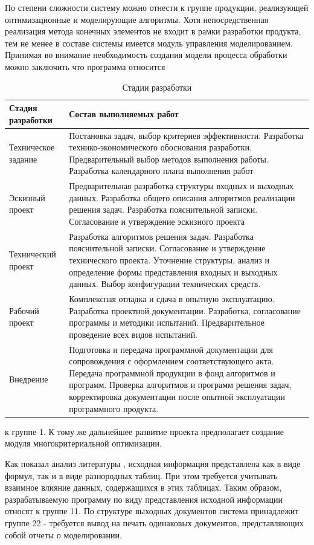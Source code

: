 \documentclass[14pt,oneside,final]{extreport}
\begin{document}
	По степени сложности систему можно отнести к группе продукции, реализующей оптимизационные и моделирующие алгоритмы. Хотя непосредственная реализация метода конечных элементов не входит в рамки разработки продукта, тем не менее в составе системы имеется модуль управления моделированием. Принимая во внимание необходимость создания модели процесса обработки можно заключить что программа относится 	\newpage
		\begin{table}[h!]
			\centering
			\caption{Стадии разработки}\label{tab:economy} 
			\begin{tabularx}{\textwidth}{|l|X|}
				
				\hline Стадия разработки & \multicolumn{1}{Z|}{Состав выполняемых работ }\\ 
				\hline Техническое задание & Постановка задач, выбор критериев эффективности. Разработка технико-экономического обоснования разработки. Предварительный выбор методов выполнения работы. Разработка календарного плана выполнения работ   \\ 
				\hline Эскизный проект & Предварительная разработка структуры входных и выходных данных. Разработка общего описания алгоритмов реализации решения задач. Разработка пояснительной записки. Согласование и утверждение эскизного проекта \\ 
				\hline Технический проект & Разработка алгоритмов решения задач. Разработка пояснительной записки. Согласование и утверждение технического проекта. Уточнение структуры, анализ и определение формы представления входных и выходных данных. Выбор конфигурации технических средств.  \\ 			
				\hline Рабочий проект & Комплексная отладка и сдача в опытную эксплуатацию. Разработка проектной документации. Разработка, согласование программы и методики испытаний. Предварительное проведение всех видов  испытаний.   \\ 			
				\hline Внедрение & Подготовка и передача программной документации для сопровождения с оформлением соответствующего акта. Передача программной продукции в фонд алгоритмов и программ. Проверка алгоритмов и программ решения задач, корректировка документации после опытной эксплуатации программного продукта. \\ 
				\hline 
			\end{tabularx}
		\end{table}
	\noindent к группе 1. К тому же дальнейшее развитие проекта предполагает создание модуля многокритериальной оптимизации. 
	
	Как показал анализ литературы \cite{book:Kosilova}, исходная информация представлена как в виде формул, так и в виде разнородных таблиц. При этом требуется учитывать взаимное влияние данных, содержащихся в этих таблицах. Таким образом, разрабатываемую программу по виду представления исходной информации относят к группе 11. По структуре выходных документов система принадлежит группе 22 - требуется вывод на печать одинаковых документов, представляющих собой отчеты о моделировании.
	
\end{document}
